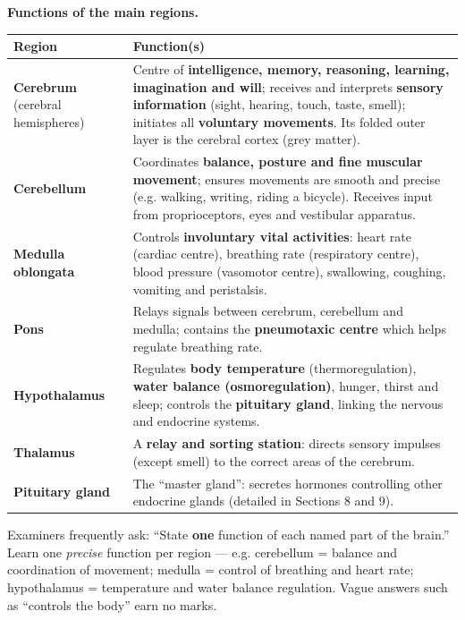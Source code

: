 \documentclass[11pt]{article}
\begin{document}
\textbf{Functions of the main regions.}

\begin{center}
\begin{tabularx}{\linewidth}{|l|X|}
\hline
\rowcolor{popblueL} \textbf{Region} & \textbf{Function(s)} \\
\hline
\textbf{Cerebrum} (cerebral hemispheres) & Centre of \textbf{intelligence, memory, reasoning, learning, imagination and will}; receives and interprets \textbf{sensory information} (sight, hearing, touch, taste, smell); initiates all \textbf{voluntary movements}. Its folded outer layer is the cerebral cortex (grey matter). \\
\hline
\textbf{Cerebellum} & Coordinates \textbf{balance, posture and fine muscular movement}; ensures movements are smooth and precise (e.g. walking, writing, riding a bicycle). Receives input from proprioceptors, eyes and vestibular apparatus. \\
\hline
\textbf{Medulla oblongata} & Controls \textbf{involuntary vital activities}: heart rate (cardiac centre), breathing rate (respiratory centre), blood pressure (vasomotor centre), swallowing, coughing, vomiting and peristalsis. \\
\hline
\textbf{Pons} & Relays signals between cerebrum, cerebellum and medulla; contains the \textbf{pneumotaxic centre} which helps regulate breathing rate. \\
\hline
\textbf{Hypothalamus} & Regulates \textbf{body temperature} (thermoregulation), \textbf{water balance (osmoregulation)}, hunger, thirst and sleep; controls the \textbf{pituitary gland}, linking the nervous and endocrine systems. \\
\hline
\textbf{Thalamus} & A \textbf{relay and sorting station}: directs sensory impulses (except smell) to the correct areas of the cerebrum. \\
\hline
\textbf{Pituitary gland} & The ``master gland'': secretes hormones controlling other endocrine glands (detailed in Sections 8 and 9). \\
\hline
\end{tabularx}
\end{center}

\begin{attention}
Examiners frequently ask: ``State \textbf{one} function of each named part of the brain.'' Learn one \emph{precise} function per region — e.g. cerebellum = balance and coordination of movement; medulla = control of breathing and heart rate; hypothalamus = temperature and water balance regulation. Vague answers such as ``controls the body'' earn no marks.
\end{attention}
\end{document}
